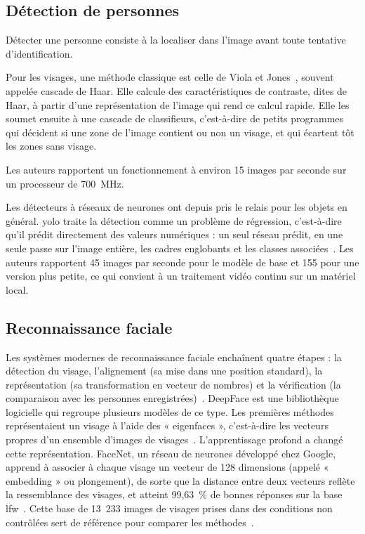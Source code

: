 \subsection{Détection de personnes}

Détecter une personne consiste à la localiser dans l'image avant toute tentative d'identification. \begin{maj}
Pour les visages, une méthode classique est celle de Viola et Jones~\cite{viola2001rapid}, souvent appelée cascade de Haar. Elle calcule des caractéristiques de contraste, dites de Haar, à partir d'une représentation de l'image qui rend ce calcul rapide. Elle les soumet ensuite à une cascade de classifieurs, c'est-à-dire de petits programmes qui décident si une zone de l'image contient ou non un visage, et qui écartent tôt les zones sans visage.
\end{maj} Les auteurs rapportent un fonctionnement à environ 15 images par seconde sur un processeur de 700~MHz.

Les détecteurs à réseaux de neurones ont depuis pris le relais pour les objets en général. \gls{yolo} traite la détection comme un problème de régression, c'est-à-dire qu'il prédit directement des valeurs numériques : un seul réseau prédit, en une seule passe sur l'image entière, les cadres englobants et les classes associées~\cite{redmon2016yolo}. Les auteurs rapportent 45 images par seconde pour le modèle de base et 155 pour une version plus petite, ce qui convient à un traitement vidéo continu sur un matériel local.

\subsection{Reconnaissance faciale}\label{sec:cosinus}

Les systèmes modernes de reconnaissance faciale enchaînent quatre étapes : la détection du visage, l'alignement (sa mise dans une position standard), la représentation (sa transformation en vecteur de nombres) et la vérification (la comparaison avec les personnes enregistrées)~\cite{serengil2020lightface}. DeepFace est une bibliothèque logicielle qui regroupe plusieurs modèles de ce type. Les premières méthodes représentaient un visage à l'aide des « eigenfaces », c'est-à-dire les vecteurs propres d'un ensemble d'images de visages~\cite{turk1991eigenfaces}. L'apprentissage profond a changé cette représentation. FaceNet, un réseau de neurones développé chez Google, apprend à associer à chaque visage un vecteur de 128 dimensions (appelé « embedding » ou plongement), de sorte que la distance entre deux vecteurs reflète la ressemblance des visages, et atteint 99,63~\% de bonnes réponses sur la base \gls{lfw}~\cite{schroff2015facenet}. Cette base de 13~233 images de visages prises dans des conditions non contrôlées sert de référence pour comparer les méthodes~\cite{huang2007lfw}.

